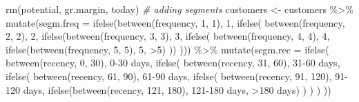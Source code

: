 \documentclass[
]{book}
\newenvironment{Shaded}{\begin{snugshade}}{\end{snugshade}}
\newcommand{\AttributeTok}[1]{\textcolor[rgb]{0.77,0.63,0.00}{#1}}
\newcommand{\CommentTok}[1]{\textcolor[rgb]{0.56,0.35,0.01}{\textit{#1}}}
\newcommand{\DecValTok}[1]{\textcolor[rgb]{0.00,0.00,0.81}{#1}}
\newcommand{\FunctionTok}[1]{\textcolor[rgb]{0.00,0.00,0.00}{#1}}
\newcommand{\NormalTok}[1]{#1}
\newcommand{\OtherTok}[1]{\textcolor[rgb]{0.56,0.35,0.01}{#1}}
\newcommand{\SpecialCharTok}[1]{\textcolor[rgb]{0.00,0.00,0.00}{#1}}
\newcommand{\StringTok}[1]{\textcolor[rgb]{0.31,0.60,0.02}{#1}}
\begin{document}
\begin{Shaded}
\begin{Highlighting}[]
\FunctionTok{rm}\NormalTok{(potential, gr.margin, today)}
\CommentTok{\# adding segments}
\NormalTok{customers }\OtherTok{\textless{}{-}}\NormalTok{ customers }\SpecialCharTok{\%\textgreater{}\%}
    \FunctionTok{mutate}\NormalTok{(}\AttributeTok{segm.freq =} \FunctionTok{ifelse}\NormalTok{(}\FunctionTok{between}\NormalTok{(frequency, }\DecValTok{1}\NormalTok{, }\DecValTok{1}\NormalTok{), }\StringTok{\textquotesingle{}1\textquotesingle{}}\NormalTok{,}
                              \FunctionTok{ifelse}\NormalTok{(}
                                  \FunctionTok{between}\NormalTok{(frequency, }\DecValTok{2}\NormalTok{, }\DecValTok{2}\NormalTok{), }\StringTok{\textquotesingle{}2\textquotesingle{}}\NormalTok{,}
                                  \FunctionTok{ifelse}\NormalTok{(}\FunctionTok{between}\NormalTok{(frequency, }\DecValTok{3}\NormalTok{, }\DecValTok{3}\NormalTok{), }\StringTok{\textquotesingle{}3\textquotesingle{}}\NormalTok{,}
                                         \FunctionTok{ifelse}\NormalTok{(}
                                             \FunctionTok{between}\NormalTok{(frequency, }\DecValTok{4}\NormalTok{, }\DecValTok{4}\NormalTok{), }\StringTok{\textquotesingle{}4\textquotesingle{}}\NormalTok{,}
                                             \FunctionTok{ifelse}\NormalTok{(}\FunctionTok{between}\NormalTok{(frequency, }\DecValTok{5}\NormalTok{, }\DecValTok{5}\NormalTok{), }\StringTok{\textquotesingle{}5\textquotesingle{}}\NormalTok{, }\StringTok{\textquotesingle{}\textgreater{}5\textquotesingle{}}\NormalTok{)}
\NormalTok{                                         ))}
\NormalTok{                              ))) }\SpecialCharTok{\%\textgreater{}\%}
    \FunctionTok{mutate}\NormalTok{(}\AttributeTok{segm.rec =} \FunctionTok{ifelse}\NormalTok{(}
        \FunctionTok{between}\NormalTok{(recency, }\DecValTok{0}\NormalTok{, }\DecValTok{30}\NormalTok{),}
        \StringTok{\textquotesingle{}0{-}30 days\textquotesingle{}}\NormalTok{,}
        \FunctionTok{ifelse}\NormalTok{(}
            \FunctionTok{between}\NormalTok{(recency, }\DecValTok{31}\NormalTok{, }\DecValTok{60}\NormalTok{),}
            \StringTok{\textquotesingle{}31{-}60 days\textquotesingle{}}\NormalTok{,}
            \FunctionTok{ifelse}\NormalTok{(}
                \FunctionTok{between}\NormalTok{(recency, }\DecValTok{61}\NormalTok{, }\DecValTok{90}\NormalTok{),}
                \StringTok{\textquotesingle{}61{-}90 days\textquotesingle{}}\NormalTok{,}
                \FunctionTok{ifelse}\NormalTok{(}
                    \FunctionTok{between}\NormalTok{(recency, }\DecValTok{91}\NormalTok{, }\DecValTok{120}\NormalTok{),}
                    \StringTok{\textquotesingle{}91{-}120 days\textquotesingle{}}\NormalTok{,}
                    \FunctionTok{ifelse}\NormalTok{(}\FunctionTok{between}\NormalTok{(recency, }\DecValTok{121}\NormalTok{, }\DecValTok{180}\NormalTok{), }\StringTok{\textquotesingle{}121{-}180 days\textquotesingle{}}\NormalTok{, }\StringTok{\textquotesingle{}\textgreater{}180 days\textquotesingle{}}\NormalTok{)}
\NormalTok{                )}
\NormalTok{            )}
\NormalTok{        )}
\NormalTok{    ))}


\end{Highlighting}
\end{Shaded}
\end{document}
